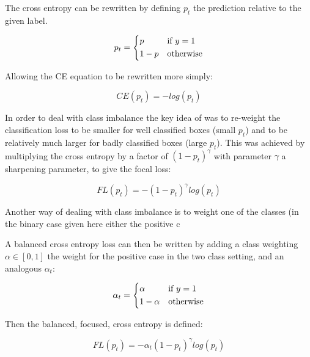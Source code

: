 The cross entropy can be rewritten by defining $p_t$ the prediction relative to the given label.

\begin{equation}
p_t = 
  \begin{cases*}
  p & if $y = 1$\\
  1 - p & otherwise\\
  \end{cases*}
\label{eq:class_prob}
\end{equation}

Allowing the \gls{CE} equation to be rewritten more simply:

\begin{equation}
CE(p_t) = -log(p_t)
\label{eq:short_cross_entropy}
\end{equation}


In order to deal with class imbalance the key idea of \cite{Lin2017} was to re-weight the classification loss to be smaller for well classified boxes (small $p_t$) and to be relatively much larger for badly classified boxes (large $p_t$). This was achieved by multiplying the cross entropy by a factor of $(1 - p_t)^\gamma $ with parameter $\gamma$ a sharpening parameter, to give the focal loss:

\begin{equation}
FL(p_t) = - (1 - p_t)^\gamma log(p_t)
\label{eq:focal_loss_p}
\end{equation}

Another way of dealing with class imbalance is to weight one of the classes (in the binary case given here either the positive c

A balanced cross entropy loss can then be written by adding a class weighting $\alpha \in \left[0, 1\right]$ the weight for the positive case in the two class setting, and an analogous $\alpha_t$:

\begin{equation}
\alpha_t = 
  \begin{cases*}
  \alpha & if $y = 1$\\
  1 - \alpha & otherwise\\
  \end{cases*}
\label{eq:balanced_weight}
\end{equation}

Then the balanced, focused, cross entropy is defined:

\begin{equation}
FL(p_t) = -\alpha_t (1 - p_t)^\gamma log(p_t)
\label{eq:focal_loss}
\end{equation}


